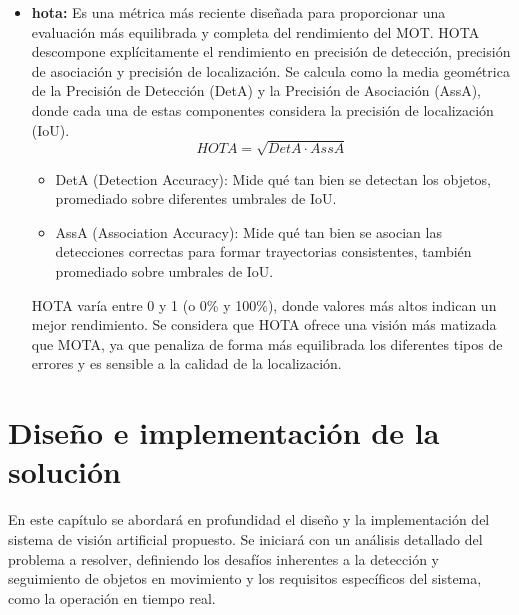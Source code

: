 \documentclass[11pt,spanish,listoffigures,listoftables]{tfgetsinf}
\begin{document}
\begin{itemize}
   \item \textbf{\gls{hota}\cite{hota_paper}:} Es una métrica más reciente diseñada para proporcionar una evaluación más equilibrada y completa del rendimiento del MOT. HOTA descompone explícitamente el rendimiento en precisión de detección, precisión de asociación y precisión de localización. Se calcula como la media geométrica de la Precisión de Detección (DetA) y la Precisión de Asociación (AssA), donde cada una de estas componentes considera la precisión de localización (IoU).
   \begin{equation}
   HOTA = \sqrt{DetA \cdot AssA}
   \end{equation}
   \begin{itemize}
     \item DetA (Detection Accuracy): Mide qué tan bien se detectan los objetos, promediado sobre diferentes umbrales de IoU.
     \item AssA (Association Accuracy): Mide qué tan bien se asocian las detecciones correctas para formar trayectorias consistentes, también promediado sobre umbrales de IoU.
   \end{itemize}
   HOTA varía entre 0 y 1 (o 0\% y 100\%), donde valores más altos indican un mejor rendimiento. Se considera que HOTA ofrece una visión más matizada que MOTA, ya que penaliza de forma más equilibrada los diferentes tipos de errores y es sensible a la calidad de la localización.


\end{itemize}





\chapter{Diseño e implementación de la solución}\label{chap:diseno_e_implementacion}

En este capítulo se abordará en profundidad el diseño y la implementación del sistema de visión artificial propuesto. Se iniciará con un análisis detallado del problema a resolver, definiendo los desafíos inherentes a la detección y seguimiento de objetos en movimiento y los requisitos específicos del sistema, como la operación en tiempo real.
\end{document}
